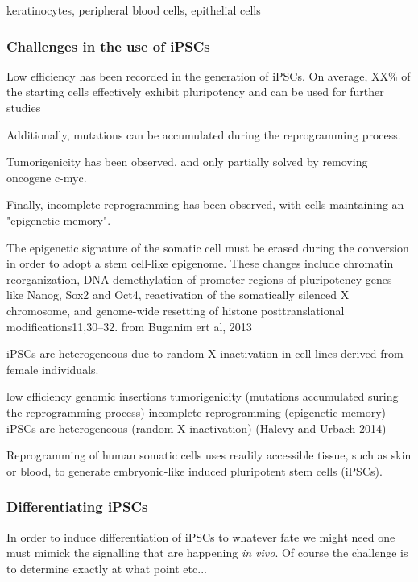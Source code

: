 keratinocytes, peripheral blood cells, epithelial cells


\subsubsection{Challenges in the use of iPSCs}
Low efficiency has been recorded in the generation of iPSCs.
On average, XX\% of the starting cells effectively exhibit pluripotency and can be used for further studies

Additionally, mutations can be accumulated during the reprogramming process.

Tumorigenicity has been observed, and only partially solved by removing oncogene c-myc.

Finally, incomplete reprogramming has been observed, with cells maintaining an "epigenetic memory".

The epigenetic signature of the somatic cell must be erased during the conversion in order to adopt a stem cell-like epigenome. These changes include chromatin reorganization, DNA demethylation of promoter regions of pluripotency genes like Nanog, Sox2 and Oct4, reactivation of the somatically silenced X chromosome, and genome-wide resetting of histone posttranslational modifications11,30–32.
from Buganim ert al, 2013 \cite{buganim2013mechanisms}

iPSCs are heterogeneous due to random X inactivation in cell lines derived from female individuals.



low efficiency
genomic insertions
tumorigenicity 
(mutations accumulated suring the reprogramming process)
incomplete reprogramming (epigenetic memory)
iPSCs are heterogeneous (random X inactivation)
\cite{halevy2014comparing} (Halevy and Urbach 2014)

\cite{park2008reprogramming}

Reprogramming of human somatic cells uses readily accessible tissue, such as skin or blood, to generate embryonic-like induced pluripotent stem cells (iPSCs). \cite{saha2009technical}

\subsubsection{Differentiating iPSCs}

In order to induce differentiation of iPSCs to whatever fate we might need one must mimick the signalling that are happening \textit{in vivo}.
Of course the challenge is to determine exactly at what point etc...

